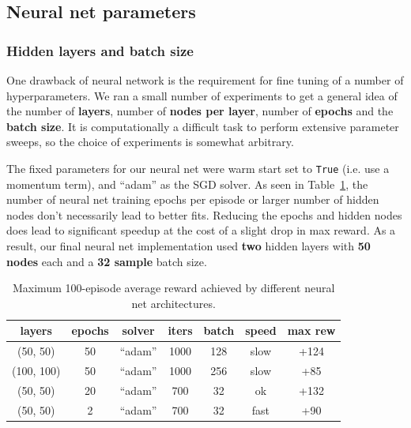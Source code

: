 \documentclass[conference]{IEEEtran}
\begin{document}
\subsection{Neural net parameters}\label{sec:nnparams}
\subsubsection{Hidden layers and batch size}
One drawback of neural network is the requirement for fine tuning of a number of hyperparameters. We ran a small number of experiments to get a general idea of the number of {\bf layers}, number of {\bf nodes per layer}, number of {\bf epochs} and the {\bf batch size}. It is computationally a difficult task to perform extensive parameter sweeps, so the choice of experiments is somewhat arbitrary. 

The fixed parameters for our neural net were warm start set to {\tt True} (i.e. use a momentum term), and ``adam'' as the SGD solver. As seen in Table~\ref{tab:nnarch}, the number of neural net training epochs per episode or larger number of hidden nodes don't necessarily lead to better fits. Reducing the epochs and hidden nodes does lead to significant speedup at the cost of a slight drop in max reward. As a result, our final neural net implementation used {\bf two} hidden layers with {\bf 50 nodes} each and a {\bf 32 sample} batch size.
\begin{table}[bpht]
\begin{center}
\begin{tabular}{|c|c|c|c|c|c|c|}
\hline
layers & epochs & solver & iters & batch & speed & max rew\\ \hline 
(50, 50) & 50 & ``adam'' & 1000 & 128 & slow & +124 \\
(100, 100) & 50 & ``adam'' & 1000 & 256 & slow & +85 \\
(50, 50) & 20 & ``adam'' & 700 & 32 & ok & +132 \\
(50, 50) & 2 & ``adam'' & 700 & 32 & fast & +90 \\ \hline
\end{tabular}
\end{center}
\caption{Maximum 100-episode average reward achieved by different neural net architectures. \label{tab:nnarch}}
\end{table}
%
\end{document}
